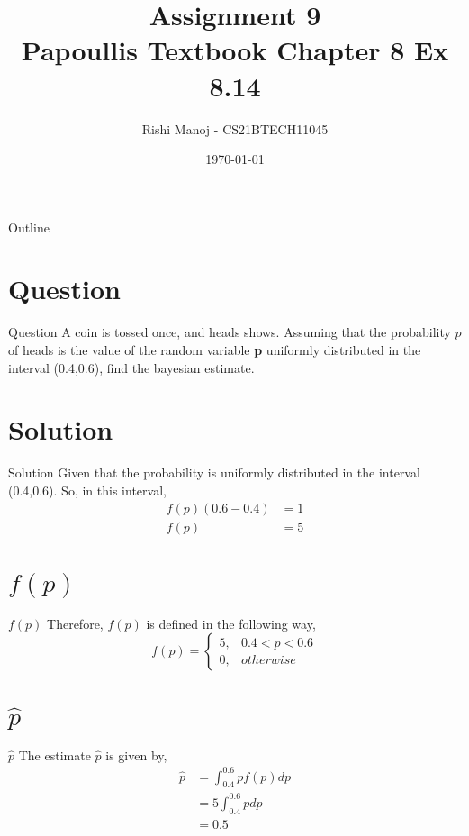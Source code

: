 \documentclass{beamer}
\title{Assignment 9 \\ Papoullis Textbook Chapter 8 Ex 8.14}
\author{Rishi Manoj - CS21BTECH11045}
\date{\today}
\begin{document}
\begin{frame}
    \titlepage 
\end{frame}

\logo{}


\begin{frame}{Outline}
    \tableofcontents
\end{frame}


\section{Question}
\begin{frame}{Question}
A coin is tossed once, and heads shows. Assuming that the probability $p$ of heads is the value of the random variable \textbf{p} uniformly distributed in the interval (0.4,0.6), find the bayesian estimate.
\end{frame}


\section{Solution}
\begin{frame}{Solution}
Given that the probability is uniformly distributed in the interval (0.4,0.6). So, in this interval,
	\begin{align}
	          f(p)(0.6-0.4) &= 1 \\
	          f(p) &= 5
    \end{align}
\end{frame}


\section{$f(p)$}
\begin{frame}{$f(p)$}
Therefore, $f(p)$ is defined in the following way,
    \begin{equation*}
           f(p)  = \begin{cases}
                    5,  & 0.4<p<0.6 \\
                    0,  & otherwise
                   \end{cases}
    \end{equation*}
\end{frame}


\section{$\hat{p}$}
\begin{frame}{$\hat{p}$}
The estimate $\hat{p}$ is given by,
    \begin{align}
           \hat{p} &= \int_{0.4}^{0.6} pf(p)dp \\
                   &= 5\int_{0.4}^{0.6} pdp \\
                   &= 0.5
    \end{align} 
\end{frame}
\end{document}
